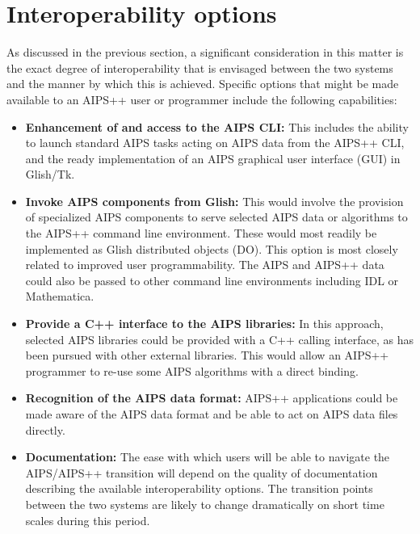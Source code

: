 \section{Interoperability options}

 As discussed in the previous section, a significant consideration in
this matter is the exact degree of interoperability that is envisaged
between the two systems and the manner by which this is
achieved. Specific options that might be made available to an AIPS++
user or programmer include the following capabilities:

\begin{itemize}

\item{{\bf Enhancement of and access to the AIPS CLI:} This includes
the ability to launch standard AIPS tasks acting on AIPS data from the
AIPS++ CLI, and the ready implementation of an AIPS graphical user
interface (GUI) in Glish/Tk.}

\item{{\bf Invoke AIPS components from Glish:} This would involve the
provision of specialized AIPS components to serve selected AIPS data
or algorithms to the AIPS++ command line environment. These would most
readily be implemented as Glish distributed objects (DO). This option
is most closely related to improved user programmability. The AIPS and
AIPS++ data could also be passed to other command line environments
including IDL or Mathematica.}

\item{{\bf Provide a C++ interface to the AIPS libraries:} In this approach,
selected AIPS libraries could be provided with a C++ calling interface, as has
been pursued with other external libraries. This would allow
an AIPS++ programmer to re-use some AIPS algorithms with a direct binding.}

\item{{\bf Recognition of the AIPS data format:} AIPS++ applications
could be made aware of the AIPS data format and be able to act on AIPS
data files directly.}

\item{{\bf Documentation:} The ease with which users will be able to
navigate the AIPS/AIPS++ transition will depend on the quality of
documentation describing the available interoperability options. The
transition points between the two systems are likely to change
dramatically on short time scales during this period.}

\end{itemize}

